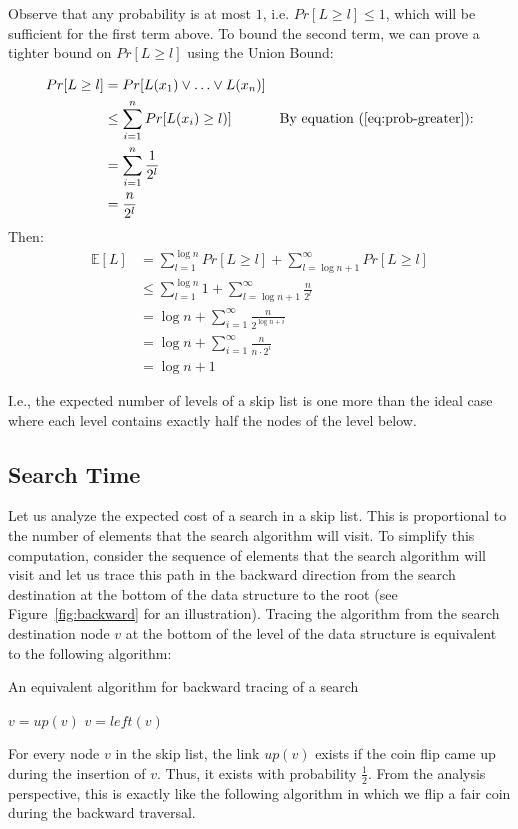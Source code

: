 \documentclass[11pt]{article}
\begin{document}
Observe that any probability is at most $1$, i.e. $Pr[L\ge l] \le 1$, which will be sufficient for the first term above. To bound the second term, we can prove a tighter bound on $Pr[L\ge l]$ using the Union Bound: 

\begin{align*}
  Pr[L \geq l] & = Pr[L(x_1) \vee \ldots \vee L(x_n)] \\
  & \leq \sum_{i=1}^{n}Pr[L(x_i) \geq l)] & \mbox{By equation (\ref{eq:prob-greater}):}\\
  & = \sum_{i=1}^{n} \frac{1}{2^l} \\
  &=  \frac{n}{2^l}
\end{align*}
Then:
\begin{align*}
    \mathbb{E}[L] &= \sum_{l=1}^{\log n} Pr[L \geq l] + \sum_{l=\log n +1}^{\infty} Pr[L \geq l]\\
    & \leq  \sum_{l=1}^{\log n} 1 + \sum_{l = \log n +1}^{\infty} \frac{n}{2^l}\\
    & = \log n + \sum_{i=1}^{\infty} \frac{n}{2^{\log n + i}}\\
    & = \log n + \sum_{i=1}^{\infty} \frac{n}{n \cdot 2^i}\\
    &= \log n + 1
\end{align*}

I.e., the expected number of levels of a skip list is one more than the ideal case where each level contains exactly half the nodes of the level below.

\subsection{Search Time}
Let us analyze the expected cost of a search in a skip list. This is proportional to the number of elements that the search algorithm will visit. To simplify this computation, consider the sequence of elements that the search algorithm will visit and let us trace this path in the backward direction from the search destination at the bottom of the data structure to the root (see Figure~\ref{fig:backward} for an illustration). Tracing the algorithm from the search destination node $v$ at the bottom of the level of the data structure is equivalent to the following algorithm:

\begin{algorithm}[H]
\caption{An equivalent algorithm for backward tracing of a search}\label{skiplist1}
\begin{algorithmic}[1]
    \State $v=up(v)$
    \Else 
    \State $v = left(v)$
    \EndIf
\EndWhile
\EndFunction
\end{algorithmic}
\end{algorithm}
For every node $v$ in the skip list, the link $up(v)$ exists if the coin flip came up  during the insertion of $v$. Thus, it exists with probability $\frac{1}{2}$. From the analysis perspective, this is exactly like the following algorithm in which we flip a fair coin during the backward traversal.
\end{document}
